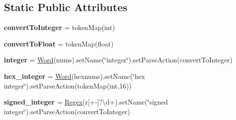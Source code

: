 \subsection*{Static Public Attributes}
\begin{DoxyCompactItemize}
\item 
\mbox{\label{classsetuptools_1_1__vendor_1_1pyparsing_1_1pyparsing__common_a775358089d347fe6298d4582b318d6e9}} 
{\bfseries convert\+To\+Integer} = token\+Map(int)
\item 
\mbox{\label{classsetuptools_1_1__vendor_1_1pyparsing_1_1pyparsing__common_a1e13d9a2d568d7cd82a4834f03f3a915}} 
{\bfseries convert\+To\+Float} = token\+Map(float)
\item 
\mbox{\label{classsetuptools_1_1__vendor_1_1pyparsing_1_1pyparsing__common_aad00f27340970a779de36816bc7f00d8}} 
{\bfseries integer} = \hyperlink{classsetuptools_1_1__vendor_1_1pyparsing_1_1_word}{Word}(nums).set\+Name(\char`\"{}integer\char`\"{}).set\+Parse\+Action(convert\+To\+Integer)
\item 
\mbox{\label{classsetuptools_1_1__vendor_1_1pyparsing_1_1pyparsing__common_a37debf5e8596edbfbfd19095cd6eae05}} 
{\bfseries hex\+\_\+integer} = \hyperlink{classsetuptools_1_1__vendor_1_1pyparsing_1_1_word}{Word}(hexnums).set\+Name(\char`\"{}hex integer\char`\"{}).set\+Parse\+Action(token\+Map(int,16))
\item 
\mbox{\label{classsetuptools_1_1__vendor_1_1pyparsing_1_1pyparsing__common_a96d1e6de1279d6727b00d4108ded02e7}} 
{\bfseries signed\+\_\+integer} = \hyperlink{classsetuptools_1_1__vendor_1_1pyparsing_1_1_regex}{Regex}(r\textquotesingle{}\mbox{[}+-\/\mbox{]}?\textbackslash{}d+\textquotesingle{}).set\+Name(\char`\"{}signed integer\char`\"{}).set\+Parse\+Action(convert\+To\+Integer)
\item 
\mbox{\label{classsetuptools_1_1__vendor_1_1pyparsing_1_1pyparsing__common_a21d8dae2e403976f5af62a24a54585d1}} 

\end{DoxyCompactItemize}
